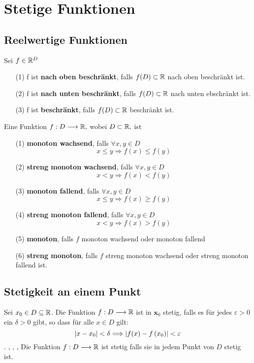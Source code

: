 \section{Stetige Funktionen}

\subsection{Reelwertige Funktionen}

\Def[3.1.1] Sei $f \in \mathbb{R}^D$
\begin{enumerate}
\item[(1)] f ist \textbf{nach oben beschränkt}, falls $f(D) \subset \mathbb{R}$ nach oben beschränkt ist.
\item[(2)] f ist \textbf{nach unten beschränkt}, falls $f(D) \subset \mathbb{R}$ nach unten ebschränkt ist.
\item[(3)] f ist \textbf{beschränkt}, falls $f(D) \subset \mathbb{R}$ beschränkt ist.
\end{enumerate}

\Def[3.1.2] Eine Funktion $f: D \longrightarrow \mathbb{R},$ wobei $D \subset \mathbb{R},$ ist
\begin{enumerate}
\item[(1)] \textbf{monoton wachsend}, falls $\forall x, y \in D$
\[
x \leqslant y \Longrightarrow f(x) \leqslant f(y)
\]
\item[(2)] \textbf{streng monoton wachsend}, falls $\forall x, y \in D$
\[
x<y \Longrightarrow f(x)<f(y)
\]
\item[(3)] \textbf{monoton fallend}, falls $\forall x, y \in D$
\[
x \leqslant y \Longrightarrow f(x) \geqslant f(y)
\]
\item[(4)] \textbf{streng monoton fallend}, falls $\forall x, y \in D$
\[
x<y \Longrightarrow f(x)>f(y)
\]
\item[(5)] \textbf{monoton}, falls $f$ monoton wachsend oder monoton fallend
\item[(6)] \textbf{streng monoton}, falls $f$ streng monoton wachsend oder streng monoton fallend ist.
\end{enumerate}

\subsection{Stetigkeit an einem Punkt}
\Def[3.2.1] Sei $x_{0} \in D \subseteq \mathbb{R}$. Die Funktion $f: D \longrightarrow \mathbb{R}$ ist in $\boldsymbol{x}_{0}$ stetig, falls es für jedes $\varepsilon>0$ ein $\delta>0$ gibt, so dass für alle $x \in D$ gilt: $$\left\lvert x-x_{0} \right\rvert<\delta \Longrightarrow\left\lvert f(x)-f\left(x_{0}\right) \right\rvert<\varepsilon$$.
\sep
\sep
\sep
\Def Die Funktion $f: D \longrightarrow \mathbb{R}$ ist stetig falls sie in jedem Punkt von $D$ stetig ist.

